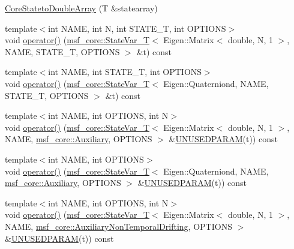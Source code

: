 \begin{DoxyCompactItemize}
\item 
\hyperlink{structmsf__tmp_1_1CoreStatetoDoubleArray_a2a0945a4188991a41a3e05d45e4624d8}{Core\-Stateto\-Double\-Array} (T \&statearray)
\item 
{\footnotesize template$<$int N\-A\-M\-E, int N, int S\-T\-A\-T\-E\-\_\-\-T, int O\-P\-T\-I\-O\-N\-S$>$ }\\void \hyperlink{structmsf__tmp_1_1CoreStatetoDoubleArray_ad2962d3a54c4d5e3dd5e61ed9d97a364}{operator()} (\hyperlink{structmsf__core_1_1StateVar__T}{msf\-\_\-core\-::\-State\-Var\-\_\-\-T}$<$ Eigen\-::\-Matrix$<$ double, N, 1 $>$, N\-A\-M\-E, S\-T\-A\-T\-E\-\_\-\-T, O\-P\-T\-I\-O\-N\-S $>$ \&t) const 
\item 
{\footnotesize template$<$int N\-A\-M\-E, int S\-T\-A\-T\-E\-\_\-\-T, int O\-P\-T\-I\-O\-N\-S$>$ }\\void \hyperlink{structmsf__tmp_1_1CoreStatetoDoubleArray_a1e2b449cd8f4bd9da501cd6ca218c678}{operator()} (\hyperlink{structmsf__core_1_1StateVar__T}{msf\-\_\-core\-::\-State\-Var\-\_\-\-T}$<$ Eigen\-::\-Quaterniond, N\-A\-M\-E, S\-T\-A\-T\-E\-\_\-\-T, O\-P\-T\-I\-O\-N\-S $>$ \&t) const 
\item 
{\footnotesize template$<$int N\-A\-M\-E, int O\-P\-T\-I\-O\-N\-S, int N$>$ }\\void \hyperlink{structmsf__tmp_1_1CoreStatetoDoubleArray_a45de4ca232716e6380870ce30d161478}{operator()} (\hyperlink{structmsf__core_1_1StateVar__T}{msf\-\_\-core\-::\-State\-Var\-\_\-\-T}$<$ Eigen\-::\-Matrix$<$ double, N, 1 $>$, N\-A\-M\-E, \hyperlink{namespacemsf__core_a7250e8c11f743373771fc229011ae788a8c6eab374d267866f8dd37afe9f13598}{msf\-\_\-core\-::\-Auxiliary}, O\-P\-T\-I\-O\-N\-S $>$ \&\hyperlink{msf__macros_8h_a2d2af1048de7b1510994ffd3bc32aacc}{U\-N\-U\-S\-E\-D\-P\-A\-R\-A\-M}(t)) const 
\item 
{\footnotesize template$<$int N\-A\-M\-E, int O\-P\-T\-I\-O\-N\-S$>$ }\\void \hyperlink{structmsf__tmp_1_1CoreStatetoDoubleArray_a6433aac027f49d4cc2bfe62a8416bd70}{operator()} (\hyperlink{structmsf__core_1_1StateVar__T}{msf\-\_\-core\-::\-State\-Var\-\_\-\-T}$<$ Eigen\-::\-Quaterniond, N\-A\-M\-E, \hyperlink{namespacemsf__core_a7250e8c11f743373771fc229011ae788a8c6eab374d267866f8dd37afe9f13598}{msf\-\_\-core\-::\-Auxiliary}, O\-P\-T\-I\-O\-N\-S $>$ \&\hyperlink{msf__macros_8h_a2d2af1048de7b1510994ffd3bc32aacc}{U\-N\-U\-S\-E\-D\-P\-A\-R\-A\-M}(t)) const 
\item 
{\footnotesize template$<$int N\-A\-M\-E, int O\-P\-T\-I\-O\-N\-S, int N$>$ }\\void \hyperlink{structmsf__tmp_1_1CoreStatetoDoubleArray_ad48356487380f3668e86f47532c831d8}{operator()} (\hyperlink{structmsf__core_1_1StateVar__T}{msf\-\_\-core\-::\-State\-Var\-\_\-\-T}$<$ Eigen\-::\-Matrix$<$ double, N, 1 $>$, N\-A\-M\-E, \hyperlink{namespacemsf__core_a7250e8c11f743373771fc229011ae788aa6011035f76e9b286df13b28730529f4}{msf\-\_\-core\-::\-Auxiliary\-Non\-Temporal\-Drifting}, O\-P\-T\-I\-O\-N\-S $>$ \&\hyperlink{msf__macros_8h_a2d2af1048de7b1510994ffd3bc32aacc}{U\-N\-U\-S\-E\-D\-P\-A\-R\-A\-M}(t)) const 

\end{DoxyCompactItemize}
